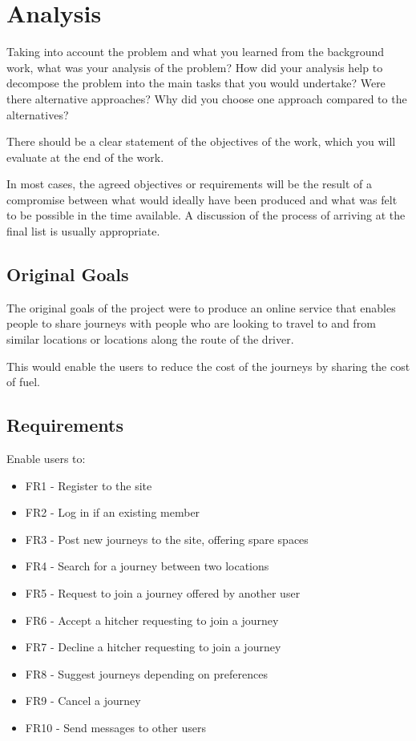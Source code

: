 \section{Analysis}
Taking into account the problem and what you learned from the background work, what was your analysis of the problem? How did your analysis help to decompose the problem into the main tasks that you would undertake? Were there alternative approaches? Why did you choose one approach compared to the alternatives? 

There should be a clear statement of the objectives of the work, which you will evaluate at the end of the work. 

In most cases, the agreed objectives or requirements will be the result of a compromise between what would ideally have been produced and what was felt to be possible in the time available. A discussion of the process of arriving at the final list is usually appropriate.

\subsection{Original Goals}
	The original goals of the project were to produce an online service that enables people to share journeys with people who are looking to travel to and from similar locations or locations along the route of the driver. 
	
	This would enable the users to reduce the cost of the journeys by sharing the cost of fuel.
	
\subsection{Requirements}
Enable users to:
\begin{itemize}
\item FR1 - Register to the site
\item FR2 - Log in if an existing member
\item FR3 - Post new journeys  to the site, offering spare spaces
\item FR4 - Search for a journey between two locations
\item FR5 - Request to join a journey offered by another user
\item FR6 - Accept a hitcher requesting to join a journey
\item FR7 - Decline a hitcher requesting to join a journey
\item FR8 - Suggest journeys depending on preferences
\item FR9 - Cancel a journey
\item FR10 - Send messages to other users
\end{itemize}

